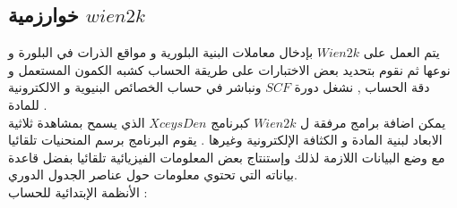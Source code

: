 \subsection{ خوارزمية $ wien2k $ }

يتم العمل على $ Wien2k $ بإدخال معاملات البنية البلورية و مواقع الذرات في البلورة و نوعها ثم  نقوم بتحديد بعض الاختبارات على طريقة الحساب كشبه الكمون المستعمل و دقة الحساب , نشغل دورة $ SCF $ ونباشر في حساب الخصائص 
البنيوية و الالكترونية للمادة .\\
يمكن اضافة برامج مرفقة ل $ Wien2k $ كبرنامج  $ XceysDen  $ الذي يسمح بمشاهدة ثلاثية الابعاد لبنية المادة و الكثافة الإلكترونية وغيرها .
يقوم البرنامج برسم المنحنيات تلقائيا مع وضع البيانات اللازمة لذلك وإستنتاج بعض المعلومات الفيزيائية تلقائيا بفضل قاعدة بياناته التي تحتوي معلومات حول عناصر الجدول الدوري.\\
الأنظمة الإبتدائية للحساب : 
